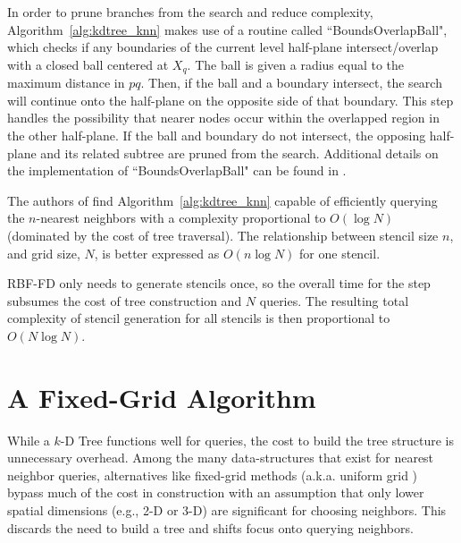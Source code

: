 \documentclass{report}
\begin{document}
In order to prune branches from the search and reduce complexity, Algorithm~\ref{alg:kdtree_knn} makes use of a routine called ``BoundsOverlapBall", which checks if any boundaries of the current level half-plane intersect/overlap with a closed ball centered at $X_q$. The ball is given a radius equal to the maximum distance in $pq$. Then, if the ball and a boundary intersect, the search will continue onto the half-plane on the opposite side of that boundary. This step handles the possibility that nearer nodes occur within the overlapped region in the other half-plane. If the ball and boundary do not intersect, the opposing half-plane and its related subtree are pruned from the search. Additional details on the implementation of ``BoundsOverlapBall" can be found in \cite{Friedman1977,TagliasacchiGC}. 

The authors of \cite{Friedman1977} find Algorithm~\ref{alg:kdtree_knn} capable of efficiently querying the $n$-nearest neighbors with a complexity proportional to $O(\log{N})$ (dominated by the cost of tree traversal). The relationship between stencil size $n$, and grid size, $N$, is better expressed as $O(n \log{N})$ for one stencil. 

RBF-FD only needs to generate stencils once, so the overall time for the step subsumes the cost of tree construction and $N$ queries. The resulting total complexity of stencil generation for all stencils is then proportional to $O(N\log{N})$. %





\section{A Fixed-Grid Algorithm}

While a $k$-D Tree functions well for queries, the cost to build the tree structure is unnecessary overhead. Among the many data-structures that exist for nearest neighbor queries, alternatives like fixed-grid methods \cite{Samet2005,Wendland2002,WendlandBook} (a.k.a. uniform grid \cite{Krog2010,Green2010}) bypass much of the cost in construction with an assumption that only lower spatial dimensions (e.g., 2-D or 3-D) are significant for choosing neighbors. This discards the need to build a tree and shifts focus onto querying neighbors. 
\end{document}
